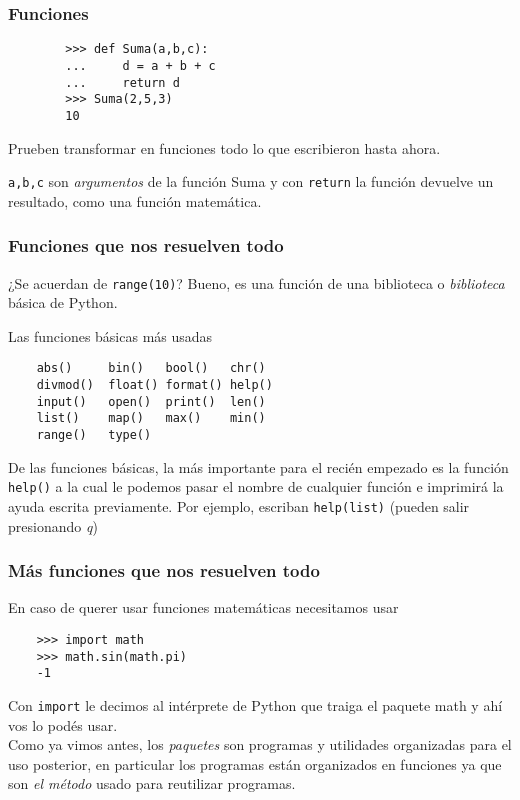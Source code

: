 \documentclass{beamer}
\begin{document}
\begin{frame}[fragile]
\frametitle{Funciones}
    \begin{verbatim}
        >>> def Suma(a,b,c):
        ...     d = a + b + c
        ...     return d
        >>> Suma(2,5,3)
        10
    \end{verbatim}
    Prueben transformar en funciones todo lo que escribieron hasta ahora.
    
    \texttt{a,b,c} son \emph{argumentos} de la función Suma y con \texttt{return} la función devuelve un resultado, como una función matemática.
\end{frame}


\begin{frame}[fragile]
    \frametitle{Funciones que nos resuelven todo}
    ¿Se acuerdan de \texttt{range(10)}? Bueno, es una función de una biblioteca o \emph{biblioteca} básica de Python.
    
    Las funciones básicas más usadas
    {\small
    \begin{center}
    \begin{verbatim}
    abs()     bin()   bool()   chr()   
    divmod()  float() format() help()  
    input()   open()  print()  len()
    list()    map()   max()    min()   
    range()   type()     
    \end{verbatim}
    \end{center}
    }
    De las funciones básicas, la más importante para el recién empezado es la función \texttt{help()} a la cual le podemos pasar el nombre de cualquier función e imprimirá la ayuda escrita previamente. Por ejemplo, escriban \texttt{help(list)} (pueden salir presionando \emph{q})

\end{frame}

\begin{frame}[fragile]
    \frametitle{Más funciones que nos resuelven todo}
    En caso de querer usar funciones matemáticas necesitamos usar
    \begin{verbatim}
    >>> import math
    >>> math.sin(math.pi)
    -1
    \end{verbatim}
    Con \texttt{import} le decimos al intérprete de Python que traiga el paquete math y ahí vos lo podés usar.\\ Como ya vimos antes, los \emph{paquetes} son programas y utilidades organizadas para el uso posterior, en particular los programas están organizados en funciones ya que son \emph{el método} usado para reutilizar programas.
\end{frame}
\end{document}

